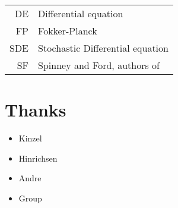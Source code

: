 \begin{tabular}{r l}
	DE & Differential equation \\
	FP & Fokker-Planck \\
	SDE & Stochastic Differential equation \\
	SF & Spinney and Ford, authors of \cite{sf}
\end{tabular}






\section*{Thanks}

\begin{itemize}
	\item Kinzel
	\item Hinrichsen
	\item Andre
	\item Group
\end{itemize}


